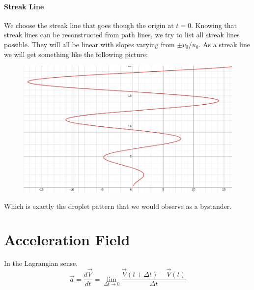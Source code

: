 \paragraph{Streak Line}
We choose the streak line that goes though the origin at $t=0$. Knowing that streak lines can be reconstructed from path lines, we try to list all streak lines possible. They will all be linear with slopes varying from $\pm v_0/u_0$. As a streak line we will get something like the following picture:
\begin{figure}[H]
	\centering
	\includegraphics[width=0.4\linewidth]{Sketches/SprinklerStreakLine}
	\label{fig:sprinklerstreakline}
\end{figure}
Which is exactly the droplet pattern that we would observe as a bystander.

\section{Acceleration Field}

In the Lagrangian sense, 
\begin{equation*}
	\vec a = \frac{d\vec V}{dt}=\lim_{\Delta t \to 0}\frac{\vec V(t+\Delta t)-\vec V(t)}{\Delta t}
\end{equation*}

